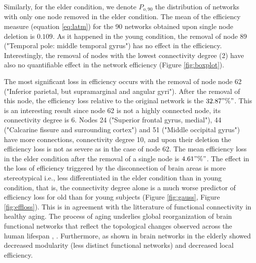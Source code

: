 \documentclass[12pt,a4paper]{article}
\begin{document}
Similarly, for the elder condition, we denote $P_{o, 90}$ the distribution of networks with only one node removed in the elder condition. 
The mean of the efficiency measure (equation \ref{eq:latm}) for the 90 networks obtained upon single node deletion is $0.109$. As it happened in the young condition, the removal of node 89 ("Temporal pole: middle temporal gyrus") has no effect in the efficiency. 
Interestingly, the removal of nodes with the lowest connectivity degree (2) have also no quantifiable effect in the network efficiency (Figure \ref{fig:boxplot}). 

The most significant loss in efficiency occurs with the removal of node node 62 ("Inferior parietal, but supramarginal and angular gyri"). After the removal of this node, the efficiency loss relative to the original network is the $32.87"\%"$. This is an interesting result since node 62 is not a highly connected node, its connectivity degree is 6. Nodes 24 ("Superior frontal gyrus, medial"), 44 ("Calcarine fissure and surrounding cortex") and 51 ("Middle occipital gyrus") have more connections, connectivity degree 10, and upon their deletion the efficiency loss is not as severe as in the case of node 62. 
The mean efficiency loss in the elder condition after the removal of a single node is  $4.61"\%"$. The effect in the loss of efficiency triggered by the disconnection of brain areas is more stereotypical i.e., less differentiated  in the elder condition than in young condition, that is, the connectivity degree alone is a much worse predictor of efficiency loss for old than for young subjects (Figure \ref{fig:gauss}, Figure \ref{fig:effloss}).
This is in agreement with the litterature of functional connectivity in healthy aging. The process of aging underlies global reorganization of brain functional networks that reflect the topological changes observed across the human lifespan \cite{cao_topological_2014}, \cite{song_age-related_2014}.  
Furthermore, as shown in \cite{geerligs_brain-wide_2015} brain networks in the elderly showed decreased modularity (less distinct functional networks) and decreased local efficiency.
\end{document}
